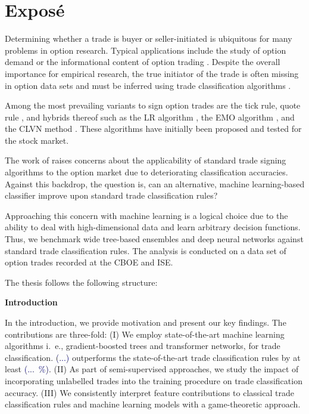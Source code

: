 \section{Exposé}
\label{sec:expose}

Determining whether a trade is buyer or seller-initiated is ubiquitous for many problems in option research. Typical applications include the study of option demand \autocite{garleanuDemandBasedOptionPricing2009} or the informational content of option trading \autocites{huDoesOptionTrading2014}{panInformationOptionVolume2006}. Despite the overall importance for empirical research, the true initiator of the trade is often missing in option data sets and must be inferred using trade classification algorithms \autocite{easleyOptionVolumeStock1998}. 

Among the most prevailing variants to sign option trades are the tick rule, quote rule \autocite{hasbrouckTradesQuotesInventories1988}, and hybrids thereof such as the \gls{LR} algorithm \autocite{leeInferringTradeDirection1991}, the \gls{EMO} algorithm \autocite{ellisAccuracyTradeClassification2000}, and the \gls{CLVN} method \autocite{chakrabartyTradeClassificationAlgorithms2007}. These algorithms have initially been proposed and tested for the stock market.

The work of \textcites{grauerOptionTradeClassification2022}{savickasInferringDirectionOption2003} raises concerns about the applicability of standard trade signing algorithms to the option market due to deteriorating classification accuracies. Against this backdrop, the question is, can an alternative, machine learning-based classifier improve upon standard trade classification rules? 

Approaching this concern with machine learning is a logical choice due to the ability to deal with high-dimensional data and learn arbitrary decision functions. Thus, we benchmark wide tree-based ensembles and deep neural networks against standard trade classification rules. The analysis is conducted on a data set of option trades recorded at the \gls{CBOE} and \gls{ISE}.

The thesis follows the following structure:

\textbf{Introduction}

In the introduction, we provide motivation and present our key findings. The contributions are three-fold: (I) We employ state-of-the-art machine learning algorithms i.~e., gradient-boosted trees and transformer networks, for trade classification. \textcolor{darkblue}{(...)} outperforms the state-of-the-art trade classification rules by at least \textcolor{darkblue}{(...~\%)}. (II) As part of semi-supervised approaches, we study the impact of incorporating unlabelled trades into the training procedure on trade classification accuracy. (III) We consistently interpret feature contributions to classical trade classification rules and machine learning models with a game-theoretic approach.

